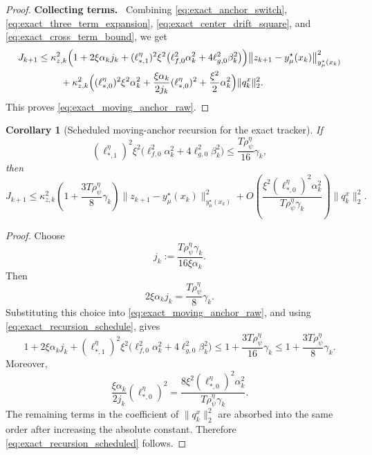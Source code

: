 \documentclass{article}
\newtheorem{corollary}{Corollary}
\newcommand{\proofstep}[1]{\par\smallskip\noindent\textbf{#1}\ }
\begin{document}
\begin{proof}
\proofstep{Collecting terms.}
Combining \eqref{eq:exact_anchor_switch}, \eqref{eq:exact_three_term_expansion},
\eqref{eq:exact_center_drift_square}, and \eqref{eq:exact_cross_term_bound}, we get
\begin{align*}
J_{k+1}
\le\;&
\kappa_{z,k}^2
\Bigl(
1
+
2\xi\alpha_k j_k
+
(\ell_{*,1}^\eta)^2\xi^2
\bigl(\ell_{f,0}^2\alpha_k^2+4\ell_{g,0}^2\beta_k^2\bigr)
\Bigr)
\big\|z_{k+1}-y_\mu^\star(x_k)\big\|_{y_\mu^\star(x_k)}^2
\\
&\quad
+
\kappa_{z,k}^2
\Bigl(
(\ell_{*,0}^\eta)^2\xi^2\alpha_k^2
+
\frac{\xi\alpha_k}{2j_k}(\ell_{*,0}^\eta)^2
+
\frac{\xi^2}{2}\alpha_k^2
\Bigr)
\|q_k^x\|_2^2 .
\end{align*}
This proves \eqref{eq:exact_moving_anchor_raw}.
\end{proof}


\begin{corollary}[Scheduled moving-anchor recursion for the exact tracker]
\label{cor:z_moving_anchor_scheduled}
If
\begin{equation}
\label{eq:exact_recursion_schedule}
(\ell_{*,1}^\eta)^2\xi^2
\bigl(\ell_{f,0}^2\alpha_k^2+4\ell_{g,0}^2\beta_k^2\bigr)
\le
\frac{T\rho_\psi^\eta}{16}\gamma_k,
\end{equation}
then
\begin{equation}
\label{eq:exact_recursion_scheduled}
J_{k+1}
\le
\kappa_{z,k}^2
\left(1+\frac{3T\rho_\psi^\eta}{8}\gamma_k\right)
\big\|z_{k+1}-y_\mu^\star(x_k)\big\|_{y_\mu^\star(x_k)}^2
+
O\!\left(
\frac{\xi^2(\ell_{*,0}^\eta)^2\alpha_k^2}
{T\rho_\psi^\eta\gamma_k}
\right)
\|q_k^x\|_2^2 .
\end{equation}
\end{corollary}

\begin{proof}
Choose
\[
j_k:=\frac{T\rho_\psi^\eta\gamma_k}{16\xi\alpha_k}.
\]
Then
\[
2\xi\alpha_k j_k
=
\frac{T\rho_\psi^\eta}{8}\gamma_k .
\]
Substituting this choice into \eqref{eq:exact_moving_anchor_raw}, and using
\eqref{eq:exact_recursion_schedule}, gives
\[
1
+
2\xi\alpha_k j_k
+
(\ell_{*,1}^\eta)^2\xi^2
\bigl(\ell_{f,0}^2\alpha_k^2+4\ell_{g,0}^2\beta_k^2\bigr)
\le
1+\frac{3T\rho_\psi^\eta}{16}\gamma_k
\le
1+\frac{3T\rho_\psi^\eta}{8}\gamma_k .
\]
Moreover,
\[
\frac{\xi\alpha_k}{2j_k}(\ell_{*,0}^\eta)^2
=
\frac{8\xi^2(\ell_{*,0}^\eta)^2\alpha_k^2}
{T\rho_\psi^\eta\gamma_k}.
\]
The remaining terms in the coefficient of \(\|q_k^x\|_2^2\) are absorbed into the same order after
increasing the absolute constant. Therefore \eqref{eq:exact_recursion_scheduled} follows.
\end{proof}
\end{document}
